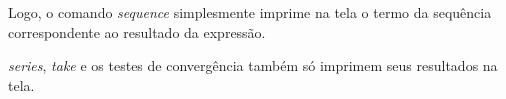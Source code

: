 \documentclass[a4 paper, 12pt]{article}
\begin{document}
\begin{description}
\begin{itemize}
    Logo, o comando \emph{sequence} simplesmente imprime na tela o
    termo da sequ\^encia correspondente ao resultado da express\~ao.

    \emph{series}, \emph{take} e os testes de converg\^encia tamb\'em
    s\'o imprimem seus resultados na tela.
  \end{itemize}

\end{description}
\end{document}
